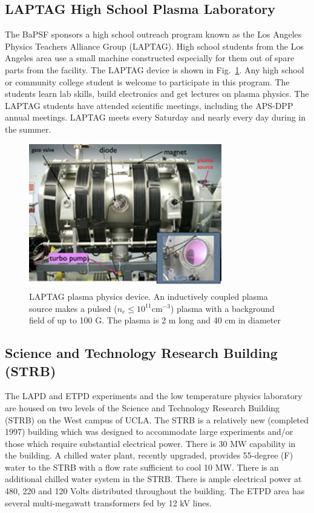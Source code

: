 \documentclass[11pt]{article}
\begin{document}
\subsection{LAPTAG High School Plasma Laboratory}
The BaPSF sponsors a high school outreach program known as the Los Angeles Physics Teachers Alliance Group  (LAPTAG).  High school students from the Los Angeles area use a small machine constructed especially for them out of spare parts from the facility.  The LAPTAG device is shown in Fig.\ \ref{fig:laptag}.  Any high school or community college student is welcome to participate in this program.  The students learn lab skills, build electronics and get lectures on plasma physics. The LAPTAG students have attended scientific meetings, including the APS-DPP annual meetings.  LAPTAG meets every Saturday and nearly every day during in the summer.
\begin{figure}[htbp] %
   \centering
   \includegraphics[width=0.75\textwidth]{laptag.jpg} 
   \caption{\small LAPTAG plasma physics device.  An inductively coupled plasma source makes a pulsed ($n_{e}\le 10^{11}$cm$^{-3}$) plasma with a background field of up to 100 G.  The plasma is 2 m long and 40 cm in diameter}
   \label{fig:laptag}
\end{figure}


\subsection{Science and Technology Research Building (STRB)}
The LAPD and ETPD experiments and the low temperature physics laboratory are housed on two levels of the Science and Technology Research Building (STRB) on the West campus of UCLA.  The STRB is a relatively new (completed 1997) building which was designed to accommodate large experiments and/or those which require substantial electrical power.  There is 30 MW capability in the building.  A chilled water plant, recently upgraded, provides 55-degree (F) water to the STRB with a flow rate sufficient to cool 10 MW.  There is an additional chilled water system in the STRB. There is ample electrical power at 480, 220 and 120 Volts distributed throughout the building.  The ETPD area has several multi-megawatt transformers fed by 12 kV lines.
\end{document}
